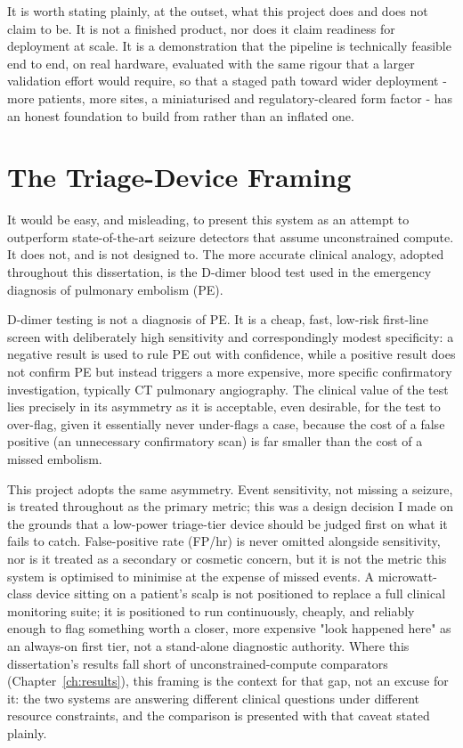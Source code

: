It is worth stating plainly, at the outset, what this project does and does not claim to be. It is not a finished product, nor does it claim readiness for deployment at scale.
It is a demonstration that the pipeline is technically feasible end to end, on real hardware, evaluated with the same rigour that a larger validation
effort would require, so that a staged path toward wider deployment - more patients, more sites, a miniaturised and regulatory-cleared form factor - has an honest 
foundation to build from rather than an inflated one.

\section{The Triage-Device Framing}
\label{sec:triage-framing}

It would be easy, and misleading, to present this system as an attempt to outperform state-of-the-art seizure detectors that assume unconstrained compute. It does not, and is not 
designed to. The more accurate clinical analogy, adopted throughout this dissertation, is the D-dimer blood test used in the emergency diagnosis of pulmonary embolism (PE).

D-dimer testing is not a diagnosis of PE. It is a cheap, fast, low-risk first-line screen with deliberately high sensitivity and correspondingly modest specificity: a negative result 
is used to rule PE out with confidence, while a positive result does not confirm PE but instead triggers a more expensive, more specific confirmatory investigation, typically CT 
pulmonary angiography. The clinical value of the test lies precisely in its asymmetry as it is acceptable, even desirable, for the test to over-flag, given it essentially never 
under-flags a case, because the cost of a false positive (an unnecessary confirmatory scan) is far smaller than the cost of a missed embolism.

This project adopts the same asymmetry. Event sensitivity, not missing a seizure, is treated throughout as the primary metric; this was a design decision I 
made on the grounds that a low-power triage-tier device should be judged first on what it fails to catch. False-positive rate (FP/hr) is never omitted alongside sensitivity, nor is it 
treated as a secondary or cosmetic concern, but it is not the metric this system is optimised to minimise at the expense of missed events. A microwatt-class device sitting on a 
patient's scalp is not positioned to replace a full clinical monitoring suite; it is positioned to run continuously, cheaply, and reliably enough to flag something worth a closer, 
more expensive "look happened here" as an always-on first tier, not a stand-alone diagnostic authority. Where this dissertation's results fall short of unconstrained-compute 
comparators (Chapter~\ref{ch:results}), this framing is the context for that gap, not an excuse for it: the two systems are answering different clinical questions under 
different resource constraints, and the comparison is presented with that caveat stated plainly.

